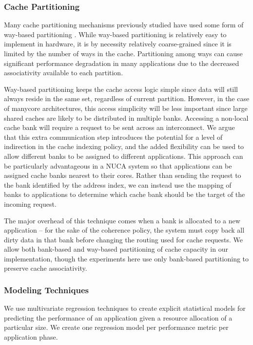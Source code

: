 \subsubsection*{Cache Partitioning}
Many cache partitioning mechanisms previously studied have used some form of way-based partitioning \cite{1331730,1152161,605420,1250671,1194855,1086328,1399982}.  While way-based partitioning is relatively easy to implement in hardware, it is by necessity relatively coarse-grained since it is limited by the number of ways in the cache.  Partitioning among ways can cause significant performance degradation in many applications due to the decreased associativity available to each partition. 

Way-based partitioning keeps the cache access logic simple since data will still always reside in the same set, regardless of current partition.  However, in the case of manycore architectures, this access simplicity will be less important since large shared caches are likely to be distributed in multiple banks.  Accessing a non-local cache bank will require a request to be sent across an interconnect. We argue that this extra communication step introduces the potential for a level of indirection in the cache indexing policy, and the added flexibility can be used to allow different banks to be assigned to different applications. This approach can be particularly advantageous in a NUCA system so that applications can be assigned cache banks nearest to their cores. Rather than sending the request to the bank identified by the address index, we can instead use the mapping of banks to applications to determine which cache bank should be the target of the incoming request. 

The major overhead of this technique comes when a bank is allocated to a new application -- for the sake of the coherence policy, the system must copy back all dirty data in that bank before changing the routing used for cache requests.  We allow both bank-based and way-based partitioning of cache capacity in our implementation, though the experiments here use only bank-based partitioning to preserve cache associativity.



\subsubsection*{Modeling Techniques}
We use multivariate regression techniques to create explicit statistical models for predicting the performance of an application given a resource allocation of a particular size.  We create one regression model per performance metric per application phase. 
 
